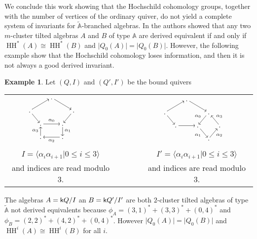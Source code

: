 \documentclass{amsart}
\theoremstyle{plain}
\theoremstyle{definition}
\newtheorem{ejem}[teo]{Example}
\begin{document}
We conclude this work showing that the Hochschild cohomology groups, together with the number of vertices of the ordinary quiver, do not yield a complete system of invariants  for $\tilde{\mathbb{A}}$-branched algebras. In \cite[Theorem 1.2]{BG14} the authors  showed that any two  $m$-cluster tilted algebras $A$ and $B$ of type $\mathbb{A}$  are derived equivalent if and only if  $\operatorname{HH}^*(A)\cong \operatorname{HH}^*(B)$ and ${\lvert {Q_0(A)}\rvert}={\lvert {Q_0(B)}\rvert}$. However, the following example show that the Hochschild cohomology loses information, and then it is not always  a good derived invariant.

\begin{ejem}
 Let $(Q,I)$ and $(Q',I')$ be the bound quivers
\medskip
\begin{center}
\begin{tabular}{ccccc}
$\SelectTips{eu}{10}\xymatrix@R=1pc@C=.6pc{
&&.\ar[drr]	&	&	& &\\
.\ar[urr] \ar[dr]	&&&&   .\ar[dl]	&& \\
&.\ar[rr]^{{\alpha}_0}	&& . \ar[d]^{{\alpha}_1}	&	&  & \\
& . \ar[u]^{{\alpha}_3} & & .\ar[ll]^{{\alpha}_2}&  &   &  }$    & && &     $\SelectTips{eu}{10}\xymatrix@R=1pc@C=.6pc{
&&.\ar[drr]	&	&	& &\\
.\ar[urr] \ar[dr]	&&&&   .\ar[dl]_{{\alpha}_0}	&& \\
&.\ar[rr]	&& . \ar[dr]_{{\alpha}_1}	&	&  . \ar[ul]_{{\alpha}_3}& \\
&  & && . \ar[ur]_{{\alpha}_2} & &  }$ \\
&&&&\\

$I=\langle {\alpha}_i{\alpha}_{i+1}| 0\leqslant i \leqslant 3\rangle$  &&&&  $I'=\langle {\alpha}_i{\alpha}_{i+1}| 0\leqslant i \leqslant 3 \rangle$  \\
and indices are read modulo 3.&&&& and indices are read modulo 3.
   \end{tabular}
\end{center}
\medskip

\end{ejem}

The algebras $A={{\normalfont{\textsf{k}}}} Q/I$ an $B={{\normalfont{\textsf{k}}}} Q'/I'$ are both $2$-cluster tilted algebras of type $\tilde{\mathbb{A}}$ not derived equivalents because $\phi_A=(3,1)^*+(3,3)^*+(0,4)^*$ and $\phi_B=(2,2)^*+(4,2)^*+(0,4)^*$. However ${\lvert {Q_0(A)}\rvert}={\lvert {Q_0(B)}\rvert}$ and $\operatorname{HH}^i(A)\cong \operatorname{HH}^i(B)$ for all $i$.
\end{document}

